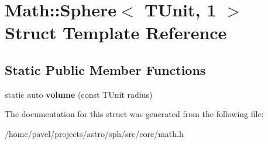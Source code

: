 \hypertarget{structMath_1_1Sphere_3_01TUnit_00_011_01_4}{}\section{Math\+:\+:Sphere$<$ T\+Unit, 1 $>$ Struct Template Reference}
\label{structMath_1_1Sphere_3_01TUnit_00_011_01_4}
\subsection*{Static Public Member Functions}
\begin{DoxyCompactItemize}
\item 
\hypertarget{structMath_1_1Sphere_3_01TUnit_00_011_01_4_a16c3e5c250413d450f41f2d03526d034}{}\label{structMath_1_1Sphere_3_01TUnit_00_011_01_4_a16c3e5c250413d450f41f2d03526d034} 
static auto {\bfseries volume} (const T\+Unit radius)
\end{DoxyCompactItemize}


The documentation for this struct was generated from the following file\+:\begin{DoxyCompactItemize}
\item 
/home/pavel/projects/astro/sph/src/core/math.\+h\end{DoxyCompactItemize}
